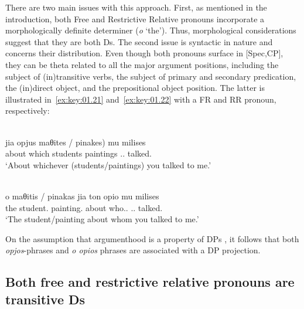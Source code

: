 \documentclass[output=paper]{langsci/langscibook}
\begin{document}
There are two main issues with this approach. First, as mentioned in the
introduction, both Free and Restrictive Relative pronouns incorporate a
morphologically definite determiner (\emph{o} ‘the’). Thus, morphological
considerations suggest that they are both Ds. The second issue is syntactic in
nature and concerns their distribution. Even though both pronouns surface in
[Spec,CP], they can be theta related to all the major argument positions,
including the subject of (in)transitive verbs, the subject of primary and
secondary predication, the (in)direct object, and the prepositional object
position. The latter is illustrated in~\eqref{ex:key:01.21}
and~\eqref{ex:key:01.22} with a \gls{FR} and \gls{RR} pronoun, respectively:

\ea {}\label{ex:key:01.21}\\
    \gll jia opjus \llap{(}maθites / pinakes) mu milises\\
        about which students {} paintings \Cl.\Fsg.\Gen{} talked.\Ssg{}\\
	\glt \enquote*{About whichever (students/paintings) you talked to me.}
\z\newpage

\ea {}\label{ex:key:01.22}\\
	\gll o maθitis / pinakas jia {ton opio} mu milises\\
        the student.\Nom{} {} painting.\Nom{} about who.\Pl.\Acc{} \Cl.\Fsg.\Gen{} talked.\Ssg{}\\
	\glt \enquote*{The student/painting about whom you talked to me.}
\z

On the assumption that argumenthood is a property of DPs
\citep{Longobardi1994}, it follows that both \emph{opjos}-phrases and
\emph{o opios} phrases are associated with a DP projection.

\subsection{Both free and restrictive relative pronouns are transitive Ds}\label{sub:key:01.4.2}
\end{document}
